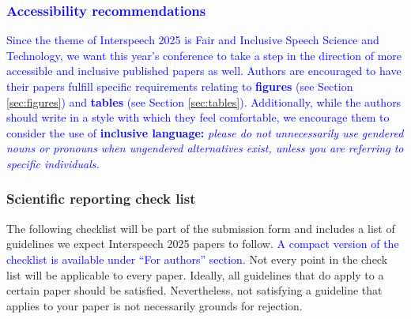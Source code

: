 \documentclass{Interspeech}
\newcommand{\blue}[1]{\textcolor{blue}{#1}}
\begin{document}
\subsubsection{\blue{Accessibility recommendations}}

\blue{Since the theme of Interspeech 2025 is Fair and Inclusive Speech Science and Technology, we want this year’s conference to take a step in the direction of more accessible and inclusive published papers as well. Authors are encouraged to have their papers fulfill specific requirements relating to \textbf{figures} (see Section \ref{sec:figures}) and \textbf{tables} (see Section \ref{sec:tables}). Additionally, while the authors should write in a style with which they feel comfortable, we encourage them to consider the use of \textbf{inclusive language:} \emph{please do not unnecessarily use gendered nouns or pronouns when ungendered alternatives exist, unless you are referring to specific individuals.}}

\subsubsection{Scientific reporting check list}

The following checklist will be part of the submission form and includes a list of guidelines we expect Interspeech 2025 papers to follow. \blue{A compact version of the checklist is available under ``For authors'' section.} Not every point in the check list will be applicable to every paper. Ideally, all guidelines that do apply to a certain paper should be satisfied. Nevertheless, not satisfying a guideline that applies to your paper is not necessarily grounds for rejection. 
\end{document}
